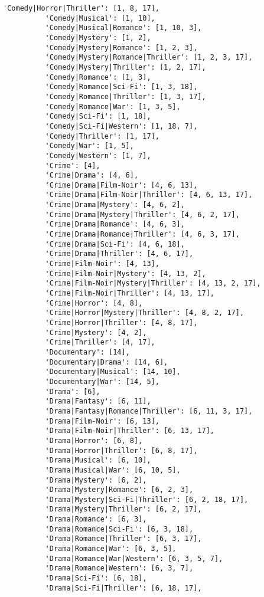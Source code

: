\documentclass[11pt]{article}
\begin{document}
\begin{Verbatim}[commandchars=\\\{\}]
          'Comedy|Horror|Thriller': [1, 8, 17],
          'Comedy|Musical': [1, 10],
          'Comedy|Musical|Romance': [1, 10, 3],
          'Comedy|Mystery': [1, 2],
          'Comedy|Mystery|Romance': [1, 2, 3],
          'Comedy|Mystery|Romance|Thriller': [1, 2, 3, 17],
          'Comedy|Mystery|Thriller': [1, 2, 17],
          'Comedy|Romance': [1, 3],
          'Comedy|Romance|Sci-Fi': [1, 3, 18],
          'Comedy|Romance|Thriller': [1, 3, 17],
          'Comedy|Romance|War': [1, 3, 5],
          'Comedy|Sci-Fi': [1, 18],
          'Comedy|Sci-Fi|Western': [1, 18, 7],
          'Comedy|Thriller': [1, 17],
          'Comedy|War': [1, 5],
          'Comedy|Western': [1, 7],
          'Crime': [4],
          'Crime|Drama': [4, 6],
          'Crime|Drama|Film-Noir': [4, 6, 13],
          'Crime|Drama|Film-Noir|Thriller': [4, 6, 13, 17],
          'Crime|Drama|Mystery': [4, 6, 2],
          'Crime|Drama|Mystery|Thriller': [4, 6, 2, 17],
          'Crime|Drama|Romance': [4, 6, 3],
          'Crime|Drama|Romance|Thriller': [4, 6, 3, 17],
          'Crime|Drama|Sci-Fi': [4, 6, 18],
          'Crime|Drama|Thriller': [4, 6, 17],
          'Crime|Film-Noir': [4, 13],
          'Crime|Film-Noir|Mystery': [4, 13, 2],
          'Crime|Film-Noir|Mystery|Thriller': [4, 13, 2, 17],
          'Crime|Film-Noir|Thriller': [4, 13, 17],
          'Crime|Horror': [4, 8],
          'Crime|Horror|Mystery|Thriller': [4, 8, 2, 17],
          'Crime|Horror|Thriller': [4, 8, 17],
          'Crime|Mystery': [4, 2],
          'Crime|Thriller': [4, 17],
          'Documentary': [14],
          'Documentary|Drama': [14, 6],
          'Documentary|Musical': [14, 10],
          'Documentary|War': [14, 5],
          'Drama': [6],
          'Drama|Fantasy': [6, 11],
          'Drama|Fantasy|Romance|Thriller': [6, 11, 3, 17],
          'Drama|Film-Noir': [6, 13],
          'Drama|Film-Noir|Thriller': [6, 13, 17],
          'Drama|Horror': [6, 8],
          'Drama|Horror|Thriller': [6, 8, 17],
          'Drama|Musical': [6, 10],
          'Drama|Musical|War': [6, 10, 5],
          'Drama|Mystery': [6, 2],
          'Drama|Mystery|Romance': [6, 2, 3],
          'Drama|Mystery|Sci-Fi|Thriller': [6, 2, 18, 17],
          'Drama|Mystery|Thriller': [6, 2, 17],
          'Drama|Romance': [6, 3],
          'Drama|Romance|Sci-Fi': [6, 3, 18],
          'Drama|Romance|Thriller': [6, 3, 17],
          'Drama|Romance|War': [6, 3, 5],
          'Drama|Romance|War|Western': [6, 3, 5, 7],
          'Drama|Romance|Western': [6, 3, 7],
          'Drama|Sci-Fi': [6, 18],
          'Drama|Sci-Fi|Thriller': [6, 18, 17],

\end{Verbatim}
\end{document}
